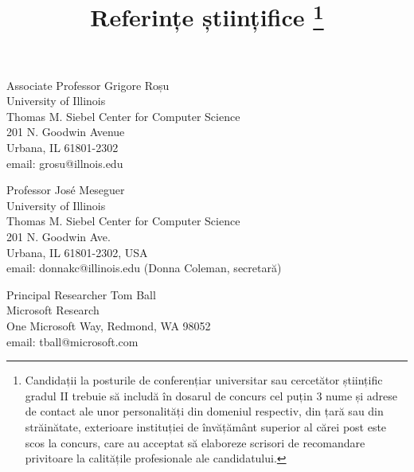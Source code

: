 \documentclass{article}
\begin{document}
\title{Referințe științifice%
  \thanks{Candidații la posturile de conferențiar universitar sau cercetător științific gradul II trebuie să includă în dosarul de concurs cel puțin 3 nume și adrese de contact ale unor personalități din domeniul respectiv, din țară sau din străinătate, exterioare instituției de învățământ superior al cărei post este scos la concurs, care au acceptat să elaboreze scrisori de recomandare privitoare la calitățile profesionale ale candidatului.}}
\author{}
\date{}
\maketitle

\noindent Associate Professor Grigore Roșu\\
University of Illinois\\
Thomas M. Siebel Center for Computer Science\\
201 N. Goodwin Avenue\\
Urbana, IL 61801-2302\\
email: grosu@illnois.edu

\bigskip
\noindent Professor Jos\'e Meseguer\\
University of Illinois\\
Thomas M. Siebel Center for Computer Science\\
201 N. Goodwin Ave.\\
Urbana, IL 61801-2302, USA\\
email: donnakc@illinois.edu (Donna Coleman, secretară)

\bigskip
\noindent Principal Researcher Tom Ball\\
Microsoft Research\\
One Microsoft Way, Redmond, WA 98052\\
email: tball@microsoft.com
\end{document}
